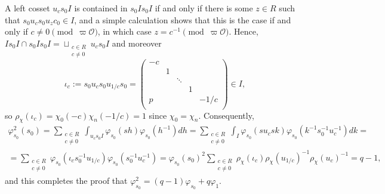 \documentclass{article}
\newcommand{\cO}{\mathcal{O}}
\theoremstyle{plain}
\theoremstyle{definition}
\begin{document}
    A left cosset $u_cs_0I$ is contained in $s_0Is_0I$ if and only if there is some $z\in R$ such that $s_0u_cs_0u_zc_0\in I$, and a simple calculation shows that this is the case if and only if $c\neq 0\pmod{\varpi\cO}$, in which case $z=c^{-1}\pmod{\varpi\cO}$. Hence, $Is_0I\cap s_0Is_0I=\sqcup_{\substack{c\in R\\c\neq0}}u_cs_0I$ and moreover 
    $$\iota_c:=s_0u_cs_0u_{1/c}s_0=\begin{pmatrix}
        -c &&&& \\
        & 1 &&& \\
        && \ddots && \\
        &&& 1 & \\
        p &&&& -1/c \\
    \end{pmatrix}\in I,$$
    so $\rho_\chi(\iota_c)=\chi_0(-c)\chi_n(-1/c)=1$ since $\chi_0=\chi_n$. Consequently, 
    \begin{align*}
        \varphi_{s_0}^2(s_0)=\sum_{\substack{c\in R\\c\neq0}}\int_{u_cs_0I}\varphi_{s_0}(sh)\varphi_{s_0}(h^{-1})dh=\sum_{\substack{c\in R\\c\neq0}}\int_{I}\varphi_{s_0}(su_csk)\varphi_{s_0}(k^{-1}s_0^{-1}u_c^{-1})dk=\\
        =\sum_{\substack{c\in R\\c\neq0}}\varphi_{s_0}(\iota_cs_0^{-1}u_{1/c})\varphi_{s_0}(s_0^{-1}u_c^{-1})=\varphi_{s_0}(s_0)^2\sum_{\substack{c\in R\\c\neq0}}\rho_\chi(\iota_c)\rho_\chi(u_{1/c})^{-1}\rho_\chi(u_c)^{-1}=q-1,
    \end{align*}
    and this completes the proof that $\varphi_{s_0}^2=(q-1)\varphi_{s_0}+q\varphi_1$.
    
    \newpage
\end{document}
